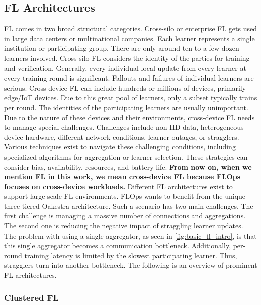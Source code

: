 \subsection{FL Architectures}

FL comes in two broad structural categories.
Cross-silo or enterprise FL gets used in large data centers or multinational companies.
Each learner represents a single institution or participating group.
There are only around ten to a few dozen learners involved.
Cross-silo FL considers the identity of the parties for training and verification.
Generally, every individual local update from every learner at every training round is significant.
Fallouts and failures of individual learners are serious.
Cross-device FL can include hundreds or millions of devices, primarily edge/IoT devices.
Due to this great pool of learners, only a subset typically trains per round.
The identities of the participating learners are usually unimportant.
Due to the nature of these devices and their environments, cross-device FL needs to manage special challenges.
Challenges include non-IID data, heterogeneous device hardware, different network conditions, learner outages, or stragglers.
Various techniques exist to navigate these challenging conditions, including specialized algorithms for aggregation or learner selection.
These strategies can consider bias, availability, resources, and battery life.
\vspace{2mm}
\newline\textbf{From now on, when we mention FL in this work, we mean cross-device FL because FLOps focuses on cross-device workloads.}
\vspace{5mm}
\newline
Different FL architectures exist to support large-scale FL environments.
FLOps wants to benefit from the unique three-tiered Oakestra \cite{paper:oakestra_usenix} architecture.
Such a scenario has two main challenges.
The first challenge is managing a massive number of connections and aggregations.
The second one is reducing the negative impact of straggling learner updates.
The problem with using a single aggregator, as seen in \ref{fig:basic_fl_intro}, is that this single aggregator becomes a communication bottleneck.
Additionally, per-round training latency is limited by the slowest participating learner.
Thus, stragglers turn into another bottleneck.
The following is an overview of prominent FL architectures.

\subsubsection{Clustered FL}

